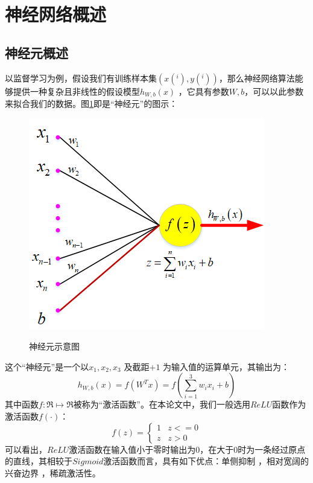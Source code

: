 \section{神经网络概述}
\subsection{神经元概述}
以监督学习为例，假设我们有训练样本集$(x(^i),y(^i))$，那么神经网络算法能够提供一种复杂且非线性的假设模型$h_{W,b}(x)$ ，它具有参数$W, b$，可以以此参数来拟合我们的数据。图\ref{fig_2_1}即是“神经元”的图示：\par
\begin{figure}[htbp]
	\centering
	\includegraphics[scale=1]{figures/chapter_2/fig_2_1.png}\\
	\caption{神经元示意图}\label{fig_2_1}
\end{figure}
这个“神经元”是一个以$x_1, x_2, x_3$ 及截距$+1$ 为输入值的运算单元，其输出为：
\begin{equation}
	h_{W,b}(x) = f(W^Tx) = f(\sum_{i=1}^3 w_{i}x_i +b)
\end{equation} 
其中函数$f : \Re \mapsto \Re$被称为“激活函数”。在本论文中，我们一般选用$ReLU$函数作为激活函数$f(\cdot)$：
\begin{equation}
	f(z) = 
	\begin{cases}
		1 & z <=0\\
		z & z > 0
	\end{cases}
\end{equation}
可以看出，$ReLU$激活函数在输入值小于零时输出为0，在大于0时为一条经过原点的直线，其相较于$Sigmoid$激活函数而言，具有如下优点：单侧抑制 ，相对宽阔的兴奋边界 ，稀疏激活性。\par

